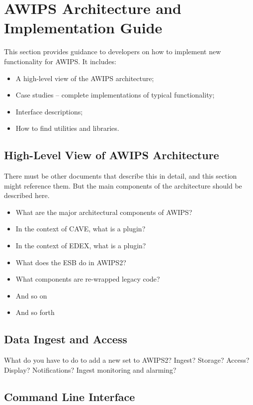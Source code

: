 
\chapter{AWIPS Architecture and Implementation Guide}

This section provides guidance to developers on how to
implement new functionality for AWIPS.  It includes:
\begin{itemize}
\item
A high-level view of the AWIPS architecture;
\item
Case studies -- complete implementations of typical
functionality;
\item
Interface descriptions;
\item
How to find utilities and libraries.
\end{itemize}


\section{High-Level View of AWIPS Architecture}

There must be other documents that describe this in detail,
and this section might reference them.
But the main components of the architecture should be described here.

\begin{itemize}
\item What are the major architectural components of AWIPS?
\item In the context of CAVE, what is a plugin?
\item In the context of EDEX, what is a plugin?  
\item What does the ESB do in AWIPS2?
\item What components are re-wrapped legacy code?
\item And so on
\item And so forth
\end{itemize}


\section{Data Ingest and Access}

What do you have to do to add a new set to AWIPS2?  Ingest?  Storage? 
Access?  Display?  Notifications?  Ingest monitoring and alarming?

\section{Command Line Interface}

